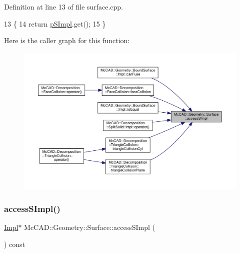 Definition at line 13 of file surface.\+cpp.


\begin{DoxyCode}
13                                        \{
14   \textcolor{keywordflow}{return} \hyperlink{classMcCAD_1_1Geometry_1_1Surface_a0097d4e9bfc1c7cd7cd33d81492b9100}{pSImpl}.get();
15 \}
\end{DoxyCode}
Here is the caller graph for this function\+:\nopagebreak
\begin{figure}[H]
\begin{center}
\leavevmode
\includegraphics[width=350pt]{d1/d2b/classMcCAD_1_1Geometry_1_1Surface_a989de1f9ebe3de043412014ed25e52eb_icgraph}
\end{center}
\end{figure}
\mbox{\label{classMcCAD_1_1Geometry_1_1Surface_adafee834670eb8c97025e24ffd6df844}} 
\subsubsection{\texorpdfstring{access\+S\+Impl()}{accessSImpl()}\hspace{0.1cm}{\footnotesize\ttfamily [2/2]}}
{\footnotesize\ttfamily \hyperlink{classMcCAD_1_1Geometry_1_1BoundSurfacePlane_1_1Impl}{Impl}$\ast$ Mc\+C\+A\+D\+::\+Geometry\+::\+Surface\+::access\+S\+Impl (\begin{DoxyParamCaption}{ }\end{DoxyParamCaption}) const\hspace{0.3cm}{\ttfamily [inherited]}}

